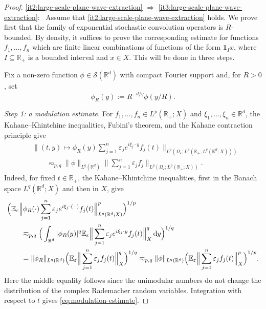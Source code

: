 \documentclass{amsart}
\theoremstyle{plain}
\theoremstyle{remark}
\theoremstyle{plain}
\numberwithin{equation}{section}
\newcommand{\R}{\mathbb R}
\newcommand{\E}{\mathbb E}
\newcommand{\1}{\mathbf 1}
\newcommand{\dd}{\,{\rm d}}
\newcommand{\mc}{\mathcal}
\begin{document}
\begin{proof}
\smallskip
\ref{it2:large-scale-plane-wave-extraction} $\Rightarrow$ \ref{it3:large-scale-plane-wave-extraction}: \  Assume that \ref{it2:large-scale-plane-wave-extraction} holds. We prove first that the family of exponential stochastic convolution operators is $R$-bounded. By density, it suffices to prove the corresponding estimate for functions $f_1,\ldots,f_n$ which are finite linear combinations of functions of the form $\1_Ix$, where $I\subseteq\R_+$ is a bounded interval and $x\in X$. This will be done in three steps.

Fix a non-zero function $\phi\in\mc S(\R^d)$ with compact Fourier support and, for $R>0$, set
\[
        \phi_R(y):=R^{-d/q}\phi(y/R).
\]

{\em Step 1: a modulation estimate.} For $f_1,\ldots,f_n\in L^p(\R_+;X)$ and $\xi_1,\ldots,\xi_n\in\R^d$, the Kahane--Khintchine inequalities, Fubini's theorem, and the Kahane contraction principle give
\begin{equation}\label{eq:modulation-estimate}
\begin{aligned}
&\Big\|
(t,y)\mapsto
\phi_R(y)\sum_{j=1}^n
\varepsilon_je^{i\xi_j\cdot y}f_j(t)
\Big\|_{L^p(\Omega_\varepsilon;
L^p(\R_+;L^q(\R^d;X)))}
\\
 &\qquad\eqsim_{p,q}
 \|\phi\|_{L^q(\R^d)}
 \Big\|
 \sum_{j=1}^n\varepsilon_jf_j
 \Big\|_{L^p(\Omega_\varepsilon;L^p(\R_+;X))}.
 \end{aligned}
 \end{equation}
 Indeed, for fixed $t\in\R_+$, the Kahane--Khintchine inequalities, first in the Banach space $L^q(\R^d;X)$ and then in $X$, give
 \begin{align*}
 & \Big(
\E_\varepsilon
\Big\|
\phi_R(\cdot)
\sum_{j=1}^n
\varepsilon_je^{i\xi_j\cdot(\,\cdot\,)}f_j(t)
\Big\|_{L^q(\R^d;X)}^p
\Big)^{1/p}
\\
&\qquad\eqsim_{p,q}
\Big(
\int_{\R^d}
|\phi_R(y)|^q
\E_\varepsilon
\Big\|
\sum_{j=1}^n
\varepsilon_je^{i\xi_j\cdot y}f_j(t)
\Big\|_X^q
\dd y
\Big)^{1/q}
\\
&\qquad=
\|\phi_R\|_{L^q(\R^d)}
\Big(
\E_\varepsilon
\Big\|
\sum_{j=1}^n\varepsilon_jf_j(t)
\Big\|_X^q
\Big)^{1/q}
\eqsim_{p,q}
\|\phi\|_{L^q(\R^d)}
\Big(
\E_\varepsilon
\Big\|
\sum_{j=1}^n\varepsilon_jf_j(t)
\Big\|_X^p
\Big)^{1/p}.
\end{align*}
Here the middle equality follows since the unimodular numbers do not change the distribution of the complex Rademacher random variables. Integration with respect to
$t$ gives \eqref{eq:modulation-estimate}.



\end{proof}
\end{document}
